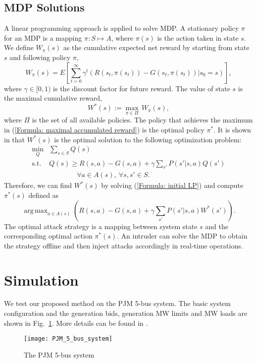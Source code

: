 \documentclass[conference,letterpaper,10pt]{IEEEtran}
\DeclareMathOperator*{\argmax}{arg\,max}
\begin{document}
\subsection{MDP Solutions}\label{sec: MDP solution}
A linear programming approach \cite{FR03,MP94} is applied to solve MDP. A stationary policy $\pi$ for an MDP is a mapping $\pi: S\mapsto A$, where $\pi(s)$ is the action taken in state $s$. We define $W_\pi(s)$ as the cumulative expected net reward by starting from state $s$ and following policy $\pi$, 
\begin{equation}
W_\pi(s)=E \left[\sum_{t=0}^{\infty}\gamma^t\left(R(s_t,\pi(s_t))-G(s_t,\pi(s_t))|s_0=s\right)\right],
\end{equation}
where $\gamma \in [0,1)$ is the discount factor for future reward.
The value of state $s$ is the maximal cumulative reward, 
\begin{equation}\label{Formula: maximal accumulated reward}
W^*(s):=\max_{\pi\in \Pi}\,W_\pi(s),
\end{equation} 
where $\Pi$ is the set of all available policies. The policy that achieves the maximum in (\ref{Formula: maximal accumulated reward}) is the optimal policy $\pi^*$.  It is shown in  \cite{FR03} that  $W^*(s)$ is the optimal solution to  the following optimization problem:
\begin{equation}\label{Formula: initial LP}
	\begin{split}
		\min_Q & \sum_{s\in S} Q(s)\\
		\text{s.t.}\ & Q(s)\geq R(s,a)-G(s,a)+\gamma \sum_{s'} P(s'|s,a)Q(s')\\ & \qquad \qquad \forall a\in A(s),\ \forall s,s' \in S.
	\end{split}
\end{equation}
Therefore, we can find $W^*(s)$ by solving   (\ref{Formula: initial LP}) 
and compute $\pi^*(s)$ defined as 
\begin{equation}\label{eqn:astar}
\argmax_{a\in A(s)}(R(s,a)-G(s,a)+\gamma \sum_{s'} P(s'|s,a)W^*(s')).
\end{equation}
 The optimal attack strategy is a mapping between system state $s$ and the corresponding optimal action $\pi^*(s)$. An intruder can solve the MDP to obtain the strategy offline and then inject attacks accordingly in real-time operations.


\section{Simulation}\label{sec:simu}
We test our proposed method on the PJM 5-bus system. The basic system configuration and the generation bids, generation MW limits and MW loads are shown in Fig.~\ref{fig: PJM 5-bus system}. More details can be found in \cite{LR10}.
\vspace{-2mm}
\begin{figure}[h]
	\centering
\texttt{[image: PJM\_5\_bus\_system]}
	\caption{The PJM 5-bus system } \vspace{-3mm}
	\label{fig: PJM 5-bus system}
\end{figure}
\end{document}
